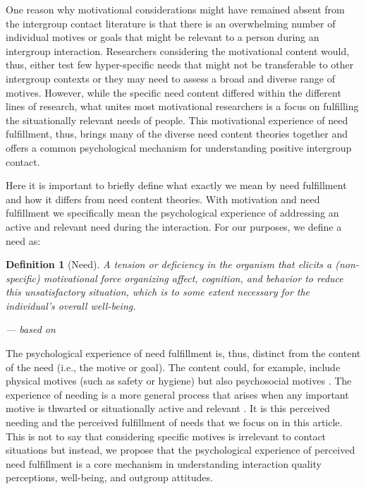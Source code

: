\documentclass[man, 12pt, a4paper, mask]{apa7}
\theoremstyle{break}
\newtheorem{definition}{Definition}
\theoremstyle{plain}
\begin{document}
One reason why motivational considerations might have remained absent from the intergroup contact literature is that there is an overwhelming number of individual motives or goals that might be relevant to a person during an intergroup interaction. Researchers considering the motivational content would, thus, either test few hyper-specific needs that might not be transferable to other intergroup contexts or they may need to assess a broad and diverse range of motives. However, while the specific need content differed within the different lines of research, what unites most motivational researchers is a focus on fulfilling the situationally relevant needs of people. This motivational experience of need fulfillment, thus, brings many of the diverse need content theories together and offers a common psychological mechanism for understanding positive intergroup contact.

Here it is important to briefly define what exactly we mean by need fulfillment and how it differs from need content theories. With motivation and need fulfillment we specifically mean the psychological experience of addressing an active and relevant need during the interaction. For our purposes, we define a need as:

\begin{definition}[Need]\label{def:need}
A tension or deficiency in the organism that elicits a (non-specific) motivational force organizing affect, cognition, and behavior to reduce this unsatisfactory situation, which is to some extent necessary for the individual’s overall well-being.
\begin{flushright}
--- based on \citet[][]{dweck2017, Hull1943, kruglanski2002, Lewin1938, McClelland1987, Ryan2017, Steverink2006}
\end{flushright}
\end{definition}

The psychological experience of need fulfillment is, thus, distinct from the content of the need (i.e., the motive or goal). The content could, for example, include physical motives (such as safety or hygiene) but also psychosocial motives \citep[such as acceptance or competence; e.g., see][]{pittman2007}. The experience of needing is a more general process that arises when any important motive is thwarted or situationally active and relevant \citep[][]{leander2020, lewin1926e, gollwitzer1985e}. It is this perceived needing and the perceived fulfillment of needs that we focus on in this article. This is not to say that considering specific motives is irrelevant to contact situations but instead, we propose that the psychological experience of perceived need fulfillment is a core mechanism in understanding interaction quality perceptions, well-being, and outgroup attitudes.
\end{document}
